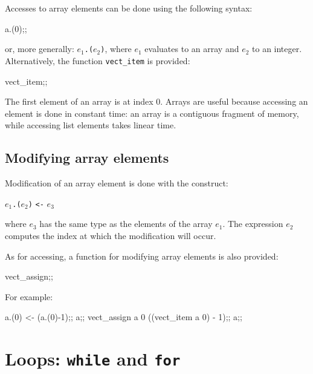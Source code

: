 Accesses to array elements can be done using the following syntax:
\begin{caml_example}
a.(0);;
\end{caml_example}
or, more generally: $e_1${\tt .(}$e_2${\tt )},
where $e_1$ evaluates to an array and $e_2$ to an integer.
Alternatively, the function \verb|vect_item| is provided:
\begin{caml_example}
vect_item;;
\end{caml_example}
The first element of an array is at index 0. Arrays are useful because
accessing an element is done in constant time: an array is a
contiguous fragment of memory, while accessing list elements takes
linear time.

\subsection{Modifying array elements}

Modification of an array element is done with the construct:
\begin{center}
$e_1${\tt .(}$e_2${\tt )} \verb|<-| $e_3$
\end{center}
where $e_3$ has the same type as the elements of the array $e_1$. The
expression $e_2$ computes the index at which the modification will occur.

As for accessing, a function for modifying array elements is also
provided:
\begin{caml_example}
vect_assign;;
\end{caml_example}
For example:
\begin{caml_example}
a.(0) <- (a.(0)-1);;
a;;
vect_assign a 0 ((vect_item a 0) - 1);;
a;;
\end{caml_example}

\section{Loops: {\tt while} and {\tt for}}


